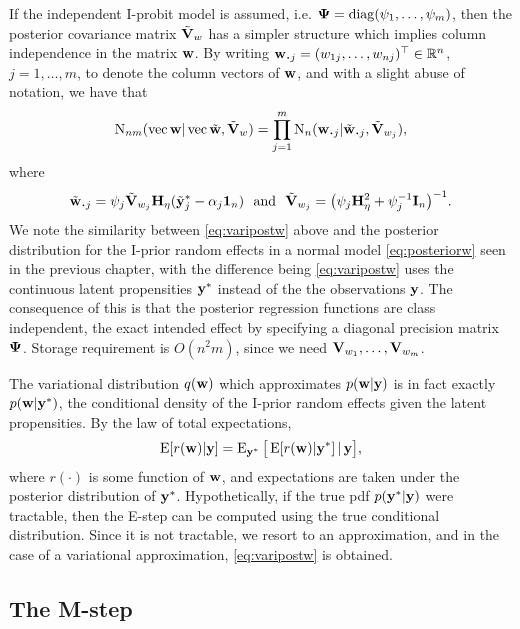 If the independent I-probit model is assumed, i.e. ${\bm\Psi} = \operatorname{diag}(\psi_1,\dots,\psi_m)$, then the posterior covariance matrix $\tilde{{\mathbf V}}_w$ has a simpler structure which implies column independence in the matrix ${\mathbf w}$.
By writing $\bw_{\bigcdot j} = (w_{1j},\dots,w_{nj})^\top \in \bbR^n$, $j=1,\dots,m$, to denote the column vectors of ${\mathbf w}$, and with a slight abuse of notation, we have that
\begin{align*}
  \N_{nm}(\vecc \bw|\vecc\wtilde, \tilde\bV_w) 
  = \prod_{j=1}^m \N_{n}(\bw_{\bigcdot j}|\tilde\bw_{\bigcdot j}, \tilde\bV_{w_j}),
\end{align*}
where 
\[
  \tilde \bw_{\bigcdot j} = \psi_j\tilde \bV_{w_j}\bH_\eta (\tilde\by^*_j - \alpha_j\bone_n) \ \text{ and } \ \tilde \bV_{w_j} = \big(\psi_j\bH_{\eta}^2 + \psi_j^{-1}\bI_n \big)^{-1}.
\]
We note the similarity between \cref{eq:varipostw} above and the posterior distribution for the I-prior random effects in a normal model \cref{eq:posteriorw} seen in the previous chapter, with the difference being \cref{eq:varipostw} uses the continuous latent propensities ${\mathbf y}^*$ instead of the the observations ${\mathbf y}$.
The consequence of this is that the posterior regression functions are class independent, the exact intended effect by specifying a diagonal precision matrix ${\bm\Psi}$.
Storage requirement is $O(n^2m)$, since we need ${\mathbf V}_{w_1},\dots,{\mathbf V}_{w_m}$.

\begin{remark}
  The variational distribution $q({\mathbf w})$ which approximates $p({\mathbf w}|{\mathbf y})$ is in fact exactly $p({\mathbf w}|{\mathbf y}^*)$, the conditional density of the I-prior random effects given the latent propensities.
  By the law of total expectations, 
  \begin{gather*}
    \operatorname{E}[r({\mathbf w})|{\mathbf y}] = \operatorname{E}_{{\mathbf y}^*}\big[ \operatorname{E}[r({\mathbf w})|{\mathbf y}^*] \,|\, {\mathbf y} \big],
  \end{gather*}
  where $r(\cdot)$ is some function of ${\mathbf w}$, and expectations are taken under the posterior distribution of ${\mathbf y}^*$.
  Hypothetically, if the true pdf $p({\mathbf y}^*|{\mathbf y})$ were tractable,  then the E-step can be computed using the true conditional distribution.
  Since it is not tractable, we resort to an approximation, and in the case of a variational approximation, \cref{eq:varipostw} is obtained.
\end{remark}



\subsection{The M-step}
\label{sec:varupdeta}

